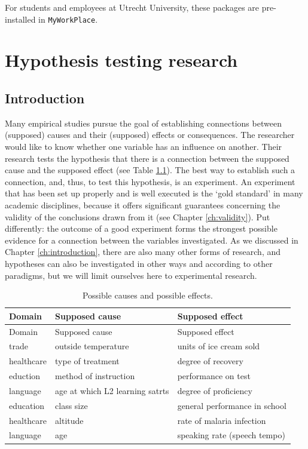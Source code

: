 \documentclass[
]{book}
\begin{document}
For students and employees at Utrecht University, these packages are pre-installed in \texttt{MyWorkPlace}.

\hypertarget{ch:research}{%
\chapter{Hypothesis testing research}\label{ch:research}}

\hypertarget{introduction}{%
\section{Introduction}\label{introduction}}

Many empirical studies pursue the goal of establishing connections between (supposed) causes and their (supposed) effects or consequences. The researcher would like to know whether one variable has an influence on another. Their research tests the hypothesis that there is a connection between the supposed cause and the supposed effect (see Table \ref{tab:causeeffect}). The best way to establish such a connection, and, thus, to test this hypothesis, is an experiment. An experiment that has been set up properly and is well executed is the `gold standard' in many academic disciplines, because it offers significant guarantees concerning the validity of the conclusions drawn from it (see Chapter \ref{ch:validity}). Put differently: the outcome of a good experiment forms the strongest possible evidence for a connection between the variables investigated. As we discussed in Chapter \ref{ch:introduction}, there are also many other forms of research, and hypotheses can also be investigated in other ways and according to other paradigms, but we will limit ourselves here to experimental research.

\begin{longtable}[]{@{}lll@{}}
\caption{\label{tab:causeeffect} Possible causes and possible effects.}\tabularnewline
\toprule
Domain & Supposed cause & Supposed effect\tabularnewline
\midrule
\endfirsthead
\toprule
Domain & Supposed cause & Supposed effect\tabularnewline
\midrule
\endhead
trade & outside temperature & units of ice cream sold\tabularnewline
healthcare & type of treatment & degree of recovery\tabularnewline
eduction & method of instruction & performance on test\tabularnewline
language & age at which L2 learning satrts & degree of proficiency\tabularnewline
education & class size & general performance in school\tabularnewline
healthcare & altitude & rate of malaria infection\tabularnewline
language & age & speaking rate (speech tempo)\tabularnewline
\bottomrule
\end{longtable}
\end{document}
